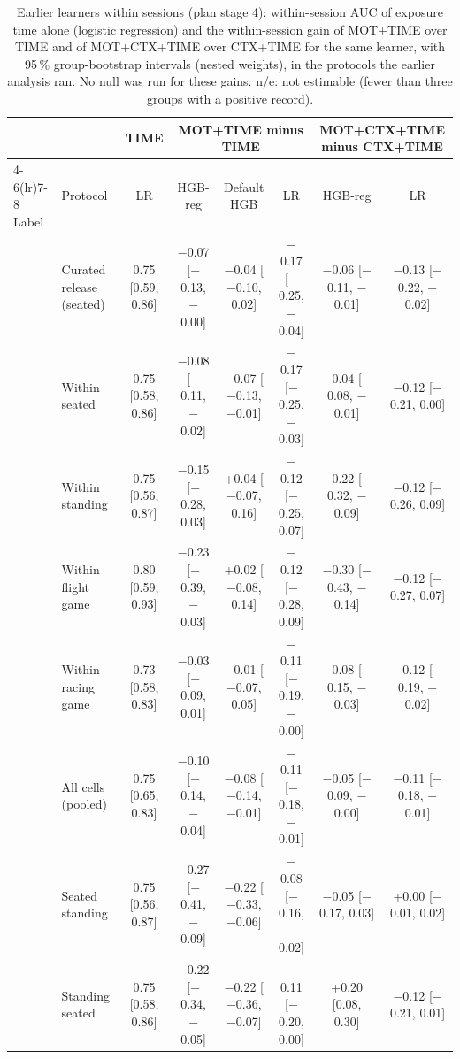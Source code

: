 \begin{table}[ht]
\centering
\scriptsize
\caption{Earlier learners within sessions (plan stage 4): within-session AUC of exposure time alone (logistic regression) and the within-session gain of MOT+TIME over TIME and of MOT+CTX+TIME over CTX+TIME for the same learner, with 95\,\% group-bootstrap intervals (nested weights), in the protocols the earlier analysis ran. No null was run for these gains. n/e: not estimable (fewer than three groups with a positive record).}
\label{tab:supp_oldwithin}
\setlength{\tabcolsep}{2pt}
\begin{tabular}{@{}llcccccc@{}}
\toprule
 & & TIME & \multicolumn{3}{c}{MOT+TIME minus TIME} & \multicolumn{2}{c}{MOT+CTX+TIME minus CTX+TIME} \\
\cmidrule(lr){4-6}\cmidrule(lr){7-8}
Label & Protocol & LR & HGB-reg & Default HGB & LR & HGB-reg & LR \\
\midrule
\sevtwo{} & Curated release (seated) & 0.75 [0.59, 0.86] & $-$0.07 [$-$0.13, $-$0.00] & $-$0.04 [$-$0.10, 0.02] & $-$0.17 [$-$0.25, $-$0.04] & $-$0.06 [$-$0.11, $-$0.01] & $-$0.13 [$-$0.22, $-$0.02] \\
 & Within seated & 0.75 [0.58, 0.86] & $-$0.08 [$-$0.11, $-$0.02] & $-$0.07 [$-$0.13, $-$0.01] & $-$0.17 [$-$0.25, $-$0.03] & $-$0.04 [$-$0.08, $-$0.01] & $-$0.12 [$-$0.21, 0.00] \\
 & Within standing & 0.75 [0.56, 0.87] & $-$0.15 [$-$0.28, 0.03] & +0.04 [$-$0.07, 0.16] & $-$0.12 [$-$0.25, 0.07] & $-$0.22 [$-$0.32, $-$0.09] & $-$0.12 [$-$0.26, 0.09] \\
 & Within flight game & 0.80 [0.59, 0.93] & $-$0.23 [$-$0.39, $-$0.03] & +0.02 [$-$0.08, 0.14] & $-$0.12 [$-$0.28, 0.09] & $-$0.30 [$-$0.43, $-$0.14] & $-$0.12 [$-$0.27, 0.07] \\
 & Within racing game & 0.73 [0.58, 0.83] & $-$0.03 [$-$0.09, 0.01] & $-$0.01 [$-$0.07, 0.05] & $-$0.11 [$-$0.19, $-$0.00] & $-$0.08 [$-$0.15, $-$0.03] & $-$0.12 [$-$0.19, $-$0.02] \\
 & All cells (pooled) & 0.75 [0.65, 0.83] & $-$0.10 [$-$0.14, $-$0.04] & $-$0.08 [$-$0.14, $-$0.01] & $-$0.11 [$-$0.18, $-$0.01] & $-$0.05 [$-$0.09, $-$0.00] & $-$0.11 [$-$0.18, $-$0.01] \\
 & Seated \ra{} standing & 0.75 [0.56, 0.87] & $-$0.27 [$-$0.41, $-$0.09] & $-$0.22 [$-$0.33, $-$0.06] & $-$0.08 [$-$0.16, $-$0.02] & $-$0.05 [$-$0.17, 0.03] & +0.00 [$-$0.01, 0.02] \\
 & Standing \ra{} seated & 0.75 [0.58, 0.86] & $-$0.22 [$-$0.34, $-$0.05] & $-$0.22 [$-$0.36, $-$0.07] & $-$0.11 [$-$0.20, 0.00] & +0.20 [0.08, 0.30] & $-$0.12 [$-$0.21, 0.01] \\

\end{tabular}
\end{table}
